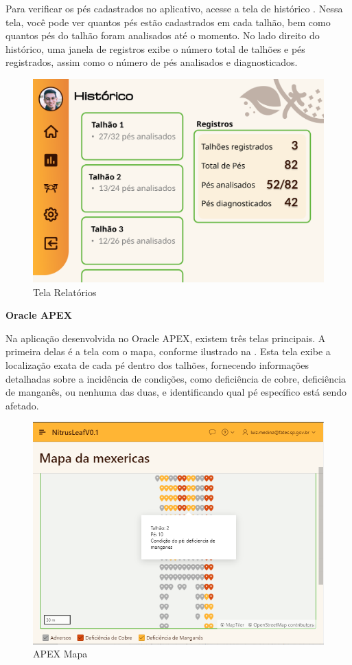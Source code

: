 Para verificar os pés cadastrados no aplicativo, acesse a tela de histórico . Nessa tela, você pode ver quantos pés estão cadastrados em cada talhão, bem como quantos pés do talhão foram analisados até o momento. No lado direito do histórico, uma janela de registros exibe o número total de talhões e pés registrados, assim como o número de pés analisados e diagnosticados.

\begin{figure}[H]
\centering
\caption{Tela Relatórios}%
\label{fig:tela-relatorios}
\includegraphics[width=0.8\linewidth]{Illustrations/tela-relatorios.png}
\end{figure}

\textbf{Oracle APEX}

Na aplicação desenvolvida no Oracle APEX, existem três telas principais. A primeira delas é a tela com o mapa, conforme ilustrado na . Esta tela exibe a localização exata de cada pé dentro dos talhões, fornecendo informações detalhadas sobre a incidência de condições, como deficiência de cobre, deficiência de manganês, ou nenhuma das duas, e identificando qual pé específico está sendo afetado.

\begin{figure}[H]
\centering
\caption{APEX Mapa}%
\label{fig:APEX-mapa}
\includegraphics[width=0.8\linewidth]{Illustrations/mapa.png}
\end{figure}

